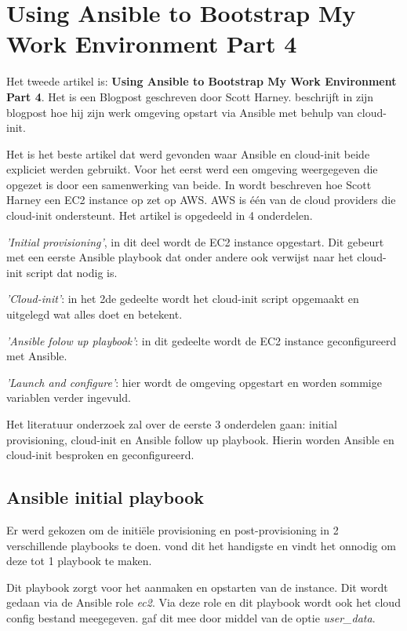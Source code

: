 \newpage

\section{Using Ansible to Bootstrap My Work Environment Part 4}
Het tweede artikel is: \textbf{Using Ansible to Bootstrap My Work Environment Part 4}. Het is een Blogpost geschreven door Scott Harney. \autocite{scottharney} beschrijft in zijn blogpost hoe hij zijn werk omgeving opstart via Ansible met behulp van cloud-init. 

Het is het beste artikel dat werd gevonden waar Ansible en cloud-init beide expliciet werden gebruikt. Voor het eerst werd een omgeving weergegeven die opgezet is door een samenwerking van beide. In \autocite{scottharney} wordt beschreven hoe Scott Harney een EC2 instance op zet op AWS. AWS is één van de cloud providers die cloud-init ondersteunt. Het artikel is opgedeeld in 4 onderdelen. 

\textit{'Initial provisioning'}, in dit deel wordt de EC2 instance opgestart. Dit gebeurt met een eerste Ansible playbook dat onder andere ook verwijst naar het cloud-init script dat nodig is. 

\textit{'Cloud-init'}: in het 2de gedeelte wordt het cloud-init script opgemaakt en uitgelegd wat alles doet en betekent. 

\textit{'Ansible folow up playbook'}: in dit gedeelte wordt de EC2 instance geconfigureerd met Ansible. 

\textit{'Launch and configure'}: hier wordt de omgeving opgestart en worden sommige variablen verder ingevuld.

Het literatuur onderzoek zal over de eerste 3 onderdelen gaan: initial provisioning, cloud-init en Ansible follow up playbook. Hierin worden Ansible en cloud-init besproken en geconfigureerd.

\subsection{Ansible initial playbook}
Er werd gekozen om de initiële provisioning en post-provisioning in 2 verschillende playbooks te doen. \autocite{scottharney} vond dit het handigste en vindt het onnodig om deze tot 1 playbook te maken. 

Dit playbook zorgt voor het aanmaken en opstarten van de instance. Dit wordt gedaan via de Ansible role \textit{ec2}. Via deze role en dit playbook wordt ook het cloud config bestand meegegeven. \autocite{scottharney} gaf dit mee door middel van de optie \textit{user\_data}. 

